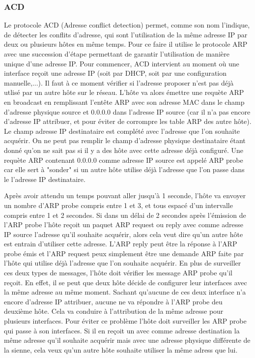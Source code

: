 \subsubsection{ACD} Le protocole ACD (Adresse conflict detection) permet, comme
son nom l'indique, de détecter les conflits d'adresse, qui sont l'utilisation
de la même adresse IP par deux ou plusieurs hôtes en même temps.  Pour ce faire
il utilise le protocole ARP avec une succession d'étape permettant de garantir
l'utilisation de manière unique d'une adresse IP.  Pour commencer, ACD
intervient au moment où une interface reçoit une adresse IP (soit par DHCP,
soit par une configuration manuelle,...). Il faut à ce moment vérifier si
l'adresse proposer n'est pas déjà utlisé par un autre hôte sur le réseau.
L'hôte va alors émettre une requète ARP en broadcast en remplissant l'entête
ARP avec son adresse MAC dans le champ d'adresse physique source et 0.0.0.0
dans l'adresse IP source (car il n'a pas encore d'adresse IP attribuer, et pour
éviter de corrompre les table ARP des autre hôte). Le champ adresse IP
destinataire est complété avec l'adresse que l'on souhaite acquérir. On ne peut
pas remplir le champ d'adresse physique destinataire étant donné qu'on ne sait
pas si il y a des hôte avec cette adresse déjà configuré.  Une requète ARP
contenant 0.0.0.0 comme adresse IP source est appelé ARP probe car elle sert à
"sonder" si un autre hôte utilise déjà l'adresse que l'on passe dans le
l'adresse IP destinataire.

Après avoir attendu un temps pouvant aller jusqu'à 1 seconde, l'hôte va envoyer
un nombre d'ARP probe compris entre 1 et 3, et tous espacé d'un intervalle
compris entre 1 et 2 secondes.  Si dans un délai de 2 secondes après l'émission
de l'ARP probe l'hôte reçoit un paquet ARP request ou reply avec comme adresse
IP source l'adresse qu'il souhaite acquérir, alors cela veut dire qu'un autre
hôte est entrain d'utiliser cette adresse. L'ARP reply peut être la réponse à
l'ARP probe émis et l'ARP request peux simplement être une demande ARP faite
par l'hôte qui utilise déjà l'adresse que l'on souhaite acquérir.  En plus de
surveiller ces deux types de messages, l'hôte doit vérifier les message ARP
probe qu'il reçoit. En effet, il se peut que deux hôte décide de configurer
leur interfaces avec la même adresse au même moment. Sachant qu'aucune de ces
deux interface n'a encore d'adresse IP attribuer, aucune ne va répondre à l'ARP
probe deu deuxième hôte. Cela va conduire à l'attribution de la même adresse
pour plusieurs interfaces. Pour éviter ce problème l'hôte doit surveiller les
ARP probe qui passe à son interfaces. Si il en reçoit un avec comme adresse
destination la même adresse qu'il souhaite acquérir mais avec une adresse
physique différente de la sienne, cela veux qu'un autre hôte souhaite utiliser
la même adress que lui.

